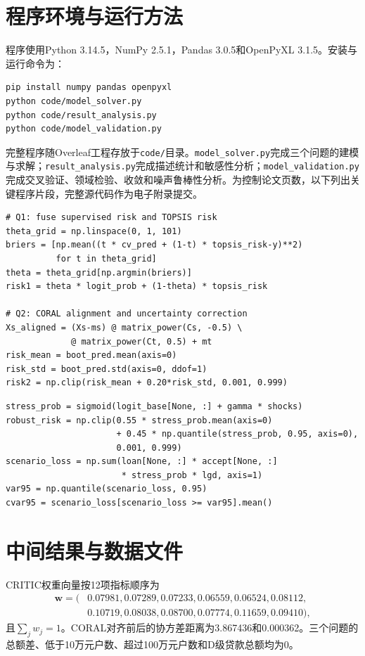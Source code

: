 \documentclass[UTF8,a4paper,12pt,fontset=fandol]{ctexart}
\numberwithin{equation}{section}
\begin{document}
\appendix
\section{程序环境与运行方法}

程序使用Python 3.14.5，NumPy 2.5.1，Pandas 3.0.5和OpenPyXL 3.1.5。安装与运行命令为：
\begin{lstlisting}[language=bash,numbers=none]
pip install numpy pandas openpyxl
python code/model_solver.py
python code/result_analysis.py
python code/model_validation.py
\end{lstlisting}
完整程序随Overleaf工程存放于\texttt{code/}目录。\texttt{model\_solver.py}完成三个问题的建模与求解；\texttt{result\_analysis.py}完成描述统计和敏感性分析；\texttt{model\_validation.py}完成交叉验证、领域检验、收敛和噪声鲁棒性分析。为控制论文页数，以下列出关键程序片段，完整源代码作为电子附录提交。

\begin{lstlisting}[caption={风险融合与迁移预测核心代码}]
# Q1: fuse supervised risk and TOPSIS risk
theta_grid = np.linspace(0, 1, 101)
briers = [np.mean((t * cv_pred + (1-t) * topsis_risk-y)**2)
          for t in theta_grid]
theta = theta_grid[np.argmin(briers)]
risk1 = theta * logit_prob + (1-theta) * topsis_risk

# Q2: CORAL alignment and uncertainty correction
Xs_aligned = (Xs-ms) @ matrix_power(Cs, -0.5) \
             @ matrix_power(Ct, 0.5) + mt
risk_mean = boot_pred.mean(axis=0)
risk_std = boot_pred.std(axis=0, ddof=1)
risk2 = np.clip(risk_mean + 0.20*risk_std, 0.001, 0.999)
\end{lstlisting}

\begin{lstlisting}[caption={情景风险与CVaR核心代码}]
stress_prob = sigmoid(logit_base[None, :] + gamma * shocks)
robust_risk = np.clip(0.55 * stress_prob.mean(axis=0)
                      + 0.45 * np.quantile(stress_prob, 0.95, axis=0),
                      0.001, 0.999)
scenario_loss = np.sum(loan[None, :] * accept[None, :]
                       * stress_prob * lgd, axis=1)
var95 = np.quantile(scenario_loss, 0.95)
cvar95 = scenario_loss[scenario_loss >= var95].mean()
\end{lstlisting}

\section{中间结果与数据文件}

CRITIC权重向量按12项指标顺序为
\begin{equation}
\begin{aligned}
\bm w=(&0.07981,0.07289,0.07233,0.06559,0.06524,0.08112,\\
       &0.10719,0.08038,0.08700,0.07774,0.11659,0.09410),
\end{aligned}
\end{equation}
且$\sum_jw_j=1$。CORAL对齐前后的协方差距离为3.867436和0.000362。三个问题的总额差、低于10万元户数、超过100万元户数和D级贷款总额均为0。
\end{document}
